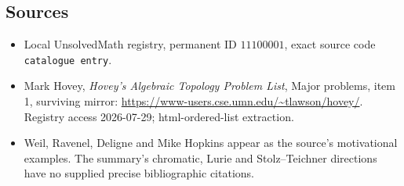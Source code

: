 \documentclass[11pt]{article}
\begin{document}
\subsection{Sources}
\begin{itemize}
\item Local UnsolvedMath registry, permanent ID \(11100001\), exact source code \texttt{catalogue entry}.
\item Mark Hovey, \emph{Hovey's Algebraic Topology Problem List}, Major problems, item 1, surviving mirror: \url{https://www-users.cse.umn.edu/~tlawson/hovey/}. Registry access 2026-07-29; html-ordered-list extraction.
\item Weil, Ravenel, Deligne and Mike Hopkins appear as the source's motivational examples. The summary's chromatic, Lurie and Stolz--Teichner directions have no supplied precise bibliographic citations.
\end{itemize}
\end{document}
